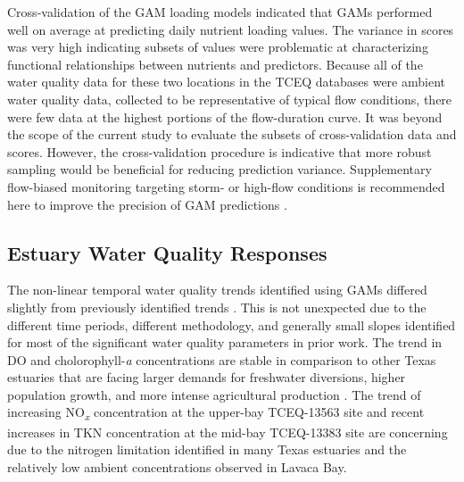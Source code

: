 \documentclass[sn-basic,referee,lineno,pdflatex]{sn-jnl}
\begin{document}
Cross-validation of the GAM loading models indicated that GAMs performed
well on average at predicting daily nutrient loading values. The
variance in scores was very high indicating subsets of values were
problematic at characterizing functional relationships between nutrients
and predictors. Because all of the water quality data for these two
locations in the TCEQ databases were ambient water quality data,
collected to be representative of typical flow conditions, there were
few data at the highest portions of the flow-duration curve. It was
beyond the scope of the current study to evaluate the subsets of
cross-validation data and scores. However, the cross-validation
procedure is indicative that more robust sampling would be beneficial
for reducing prediction variance. Supplementary flow-biased monitoring
targeting storm- or high-flow conditions is recommended here to improve
the precision of GAM predictions
\citep{horowitzEvaluationSedimentRating2003, snelderEstimationCatchmentNutrient2017}.

\hypertarget{estuary-water-quality-responses}{%
\subsection{Estuary Water Quality
Responses}\label{estuary-water-quality-responses}}

The non-linear temporal water quality trends identified using GAMs
differed slightly from previously identified trends
\citep{bugica_water_2020}. This is not unexpected due to the different
time periods, different methodology, and generally small slopes
identified for most of the significant water quality parameters in prior
work. The trend in DO and cholorophyll-\emph{a} concentrations are
stable in comparison to other Texas estuaries that are facing larger
demands for freshwater diversions, higher population growth, and more
intense agricultural production
\citep{wetzWaterQualityDynamics2016, bugica_water_2020}. The trend of
increasing NO\textsubscript{\emph{x}} concentration at the upper-bay
TCEQ-13563 site and recent increases in TKN concentration at the mid-bay
TCEQ-13383 site are concerning due to the nitrogen limitation identified
in many Texas estuaries
\citep{gardnerNitrogenFixationDissimilatory2006, houTransformationFateNitrate2012, doradoUnderstandingInteractionsFreshwater2015, paudelRelationshipSuspendedSolids2019, wetz_exceptionally_2017}
and the relatively low ambient concentrations observed in Lavaca Bay.
\end{document}
